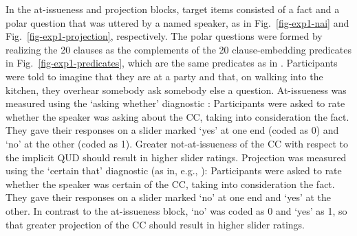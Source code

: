 \documentclass[11pt,fleqn]{article}
\newcommand{\6}{\mbox{$[\hspace*{-.6mm}[$}}
\newcommand{\9}{\mbox{$]\hspace*{-.6mm}]$}}
\begin{document}
In the at-issueness and projection blocks, target items consisted of a fact and a polar question that was uttered by a named speaker, as in Fig.~\ref{fig-exp1-nai} and Fig.~\ref{fig-exp1-projection}, respectively. The polar questions were formed by realizing the 20 clauses as the complements of the 20 clause-embedding predicates in Fig.~\ref{fig-exp1-predicates}, which are the same predicates as in \citealt{degen-tonhauser-openmind,degen-tonhauser-language}.  Participants were told to imagine that they are at a party and that, on walking into the kitchen, they overhear somebody ask somebody else a question. At-issueness was measured using the `asking whether' diagnostic  \citep[as in][]{tbd-variability}: Participants were asked to rate whether the speaker was asking about the CC, taking into consideration the fact. They gave their responses on a slider marked `yes' at one end (coded as 0) and `no' at the other (coded as 1). Greater not-at-issueness of the CC with respect to the implicit QUD should result in higher slider ratings. Projection was measured using the `certain that' diagnostic (as in, e.g., \citealt{tbd-variability, mahler2020,degen-tonhauser-language}): Participants were asked to rate whether the speaker was certain of the CC, taking into consideration the fact. They gave their responses on a slider marked `no' at one end and `yes' at the other.  In contrast to the at-issueness block, `no' was coded as 0 and `yes' as 1, so that greater projection of the CC should result in higher slider ratings. 
\end{document}
